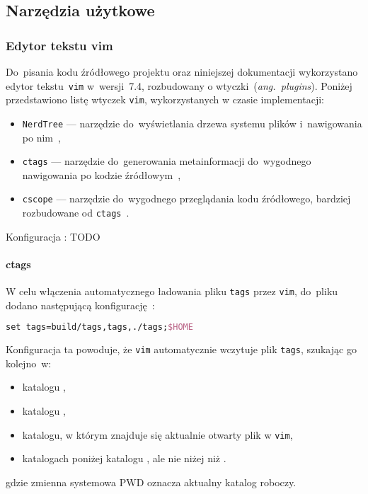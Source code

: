 \documentclass[thesis]{subfiles}
\begin{document}

\subsection{Narzędzia użytkowe}


\subsubsection{Edytor tekstu vim}

Do~pisania kodu źródłowego projektu oraz niniejszej dokumentacji wykorzystano edytor tekstu~\texttt{vim} w~wersji~7.4, rozbudowany o wtyczki~(\emph{ang.~plugins}). Poniżej przedstawiono listę wtyczek \texttt{vim}, wykorzystanych w czasie implementacji:
\begin{itemize}
	\item\texttt{NerdTree} --- narzędzie do~wyświetlania drzewa systemu plików i~nawigowania po nim~\cite{nerdtree-vimorg,nerdtree-github},
	\item\texttt{ctags} --- narzędzie do~generowania metainformacji do~wygodnego nawigowania po kodzie źródłowym~\cite{ctags},
	\item\texttt{cscope} --- narzędzie do~wygodnego przeglądania kodu źródłowego, bardziej rozbudowane od \texttt{ctags}~\cite{cscope}.
\end{itemize}

Konfiguracja :
TODO

\paragraph{ctags}

W celu włączenia automatycznego ładowania pliku \texttt{tags} przez \texttt{vim}, do~pliku \mbox{} dodano następującą konfigurację~\cite{ctags,ctags-tricks}:
\begin{lstlisting}[language=tex,numbers=none,caption={Konfiguracja \texttt{ctags} w~\texttt{.vimrc}}]
set tags=build/tags,tags,./tags;$HOME
\end{lstlisting}
Konfiguracja ta powoduje, że \texttt{vim} automatycznie wczytuje plik \texttt{tags}, szukając go kolejno~w:
\begin{itemize}[font=\ttfamily]
	\item katalogu ,
	\item katalogu ,
	\item katalogu, w którym znajduje się aktualnie otwarty plik w \texttt{vim},
	\item katalogach poniżej katalogu , ale nie niżej niż .
\end{itemize}
gdzie zmienna systemowa \gls{PWD} oznacza aktualny katalog roboczy.
\end{document}
